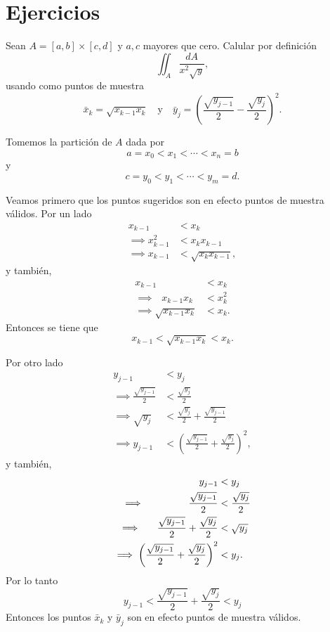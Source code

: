 \documentclass[mid,fleqn,draft,twoside]{notasdeclase}
\renewcommand{\t}{\times}
\begin{document}
\section{Ejercicios}

\newcommand{\xk}{x_{k}}\newcommand{\xkk}{x_{k-1}}
\newcommand{\yj}{y_{j}}\newcommand{\yjj}{y_{j-1}}
\begin{ejer}
	Sean $A = [a,b]\t[c,d]$ y $a,c$ mayores que cero. Calular por definición 
	\[ \iint_{A} \frac{dA}{x^2\sqrt{y}}, \]
	usando como puntos de muestra
	\[ \bar x_k = \sqrt{\xkk\xk}\quad\text{y}\quad\bar y_j=\left( \frac{\sqrt{\yjj}}{2} - \frac{\sqrt{\yj}}{2} \right)^2. \] 
\end{ejer}
\begin{sol}
	Tomemos la partición de $A$ dada por
	\[ a=x_0<x_1<\cdots<x_n=b \]
	y
	\[ c=y_0<y_1<\cdots<y_m=d. \]
	
	Veamos primero que los puntos sugeridos son en efecto puntos de muestra válidos. Por un lado
	\begin{align*}
		 \xkk&<\xk \\
		\implies \xkk^2 &< \xk\xkk \\
		\implies \xkk &< \sqrt{\xk\xkk},
	\end{align*}
	y también,
	\begin{align*}
		 \xkk&<\xk \\
		\implies\,\phantom{a}\xkk\xk &< \xk^2 \\
		\implies \sqrt{\xkk\xk} &< \xk.
	\end{align*}
	Entonces se tiene que
	\[ \xkk < \sqrt{\xkk\xk} < \xk. \]
	
	Por otro lado
	{\allowdisplaybreaks
	\begin{align*}
	\yjj &< \yj\\
	\implies \frac{\sqrt{\yjj}}{2} &< \frac{\sqrt{\yj}}{2} \\
	\implies \sqrt{\yj} &<  \frac{\sqrt{\yj}}{2} + \frac{\sqrt{\yjj}}{2} \\
	\implies \yjj &< \left( \frac{\sqrt{\yjj}}{2} + \frac{\sqrt{\yj}}{2} \right)^2,
	\end{align*}}
	y también,
	\begin{align*}
		\yjj &< \yj\\
		\implies\hspace{4.3em} \frac{\sqrt{\yjj}}{2} &< \frac{\sqrt{\yj}}{2} \\
		\implies\hspace{1.4em} \frac{\sqrt{\yjj}}{2} + \frac{\sqrt{\yj}}{2} &< \sqrt{\yj} \\
		\implies \left( \frac{\sqrt{\yjj}}{2} + \frac{\sqrt{\yj}}{2} \right)^2 &< \yj.
	\end{align*}
	Por lo tanto
	\[ \yjj < \frac{\sqrt{\yjj}}{2} + \frac{\sqrt{\yj}}{2} < \yj \]
	Entonces los puntos $\bar x_k$ y $\bar y_j$ son en efecto puntos de muestra válidos.
	

\end{sol}
\end{document}
